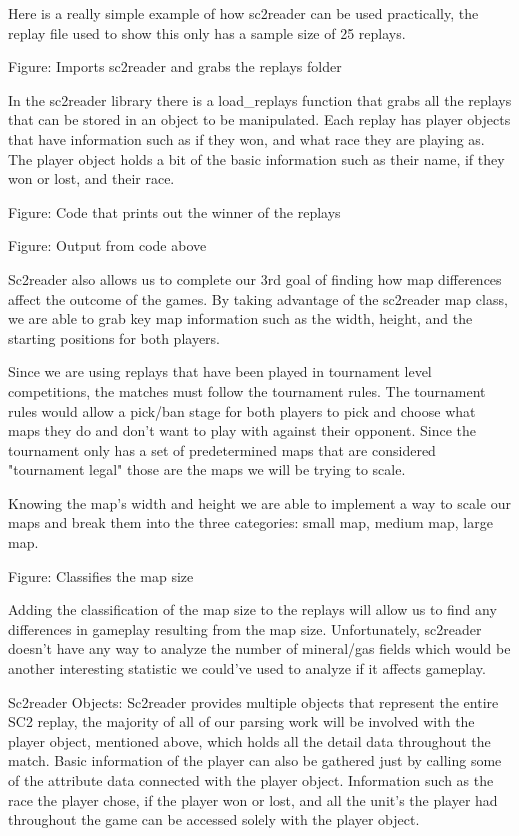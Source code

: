 \documentclass[a4paper,12pt]{report}
\begin{document}
Here is a really simple example of how sc2reader can be used practically, the replay file used to show this only has a sample size of 25 replays.

Figure: Imports sc2reader and grabs the replays folder

In the sc2reader library there is a load\_replays function that grabs all the replays that can be stored in an object to be manipulated. Each replay has player objects that have information such as if they won, and what race they are playing as. The player object holds a bit of the basic information such as their name, if they won or lost, and their race. 


Figure: Code that prints out the winner of the replays


Figure: Output from code above

Sc2reader also allows us to complete our 3rd goal of finding how map differences affect the outcome of the games. By taking advantage of the sc2reader map class, we are able to grab key map information such as the width, height, and the starting positions for both players.

Since we are using replays that have been played in tournament level competitions, the matches must follow the tournament rules. The tournament rules would allow a pick/ban stage for both players to pick and choose what maps they do and don’t want to play with against their opponent. Since the tournament only has a set of predetermined maps that are considered "tournament legal" those are the maps we will be trying to scale.

Knowing the map’s width and height we are able to implement a way to scale our maps and break them into the three categories: small map, medium map, large map.


Figure: Classifies the map size

Adding the classification of the map size to the replays will allow us to find any differences in gameplay resulting from the map size. Unfortunately, sc2reader doesn’t have any way to analyze the number of mineral/gas fields which would be another interesting statistic we could’ve used to analyze if it affects gameplay.


Sc2reader Objects:
Sc2reader provides multiple objects that represent the entire SC2 replay, the majority of all of our parsing work will be involved with the player object, mentioned above,  which holds all the detail data throughout the match. Basic information of the player can also be gathered just by calling some of the attribute data connected with the player object. Information such as the race the player chose, if the player won or lost, and all the unit’s the player had throughout the game can be accessed solely with the player object.
\end{document}
